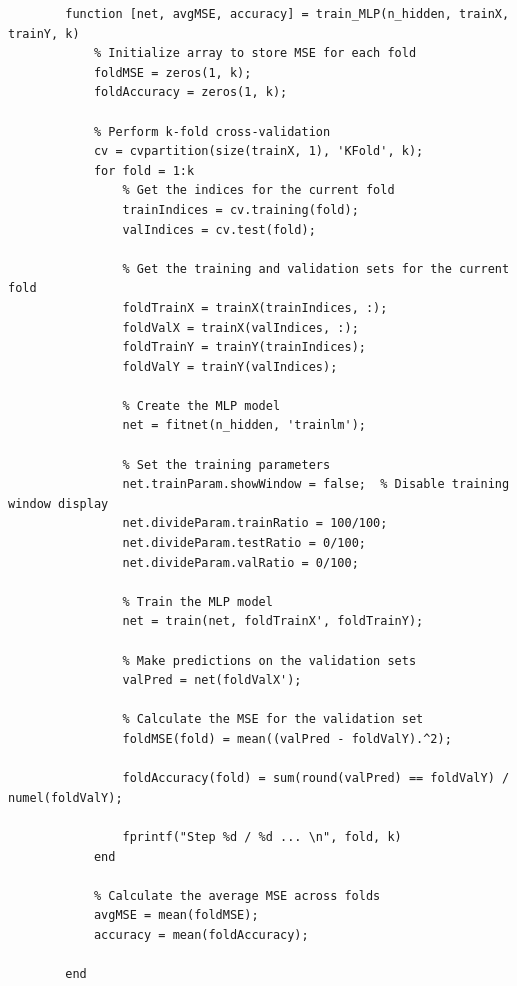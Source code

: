 \documentclass[]{article}
\begin{document}
	\begin{lstlisting}
		function [net, avgMSE, accuracy] = train_MLP(n_hidden, trainX, trainY, k)
			% Initialize array to store MSE for each fold
			foldMSE = zeros(1, k);
			foldAccuracy = zeros(1, k);
			
			% Perform k-fold cross-validation
			cv = cvpartition(size(trainX, 1), 'KFold', k);
			for fold = 1:k
				% Get the indices for the current fold
				trainIndices = cv.training(fold);
				valIndices = cv.test(fold);
				
				% Get the training and validation sets for the current fold
				foldTrainX = trainX(trainIndices, :);
				foldValX = trainX(valIndices, :);
				foldTrainY = trainY(trainIndices);
				foldValY = trainY(valIndices);
				
				% Create the MLP model
				net = fitnet(n_hidden, 'trainlm');
				
				% Set the training parameters
				net.trainParam.showWindow = false;  % Disable training window display
				net.divideParam.trainRatio = 100/100;
				net.divideParam.testRatio = 0/100;
				net.divideParam.valRatio = 0/100;
				
				% Train the MLP model
				net = train(net, foldTrainX', foldTrainY);
				
				% Make predictions on the validation sets
				valPred = net(foldValX');
				
				% Calculate the MSE for the validation set
				foldMSE(fold) = mean((valPred - foldValY).^2);
				
				foldAccuracy(fold) = sum(round(valPred) == foldValY) / numel(foldValY);
				
				fprintf("Step %d / %d ... \n", fold, k)
			end
			
			% Calculate the average MSE across folds
			avgMSE = mean(foldMSE);
			accuracy = mean(foldAccuracy);
		
		end
	\end{lstlisting}
\end{document}
